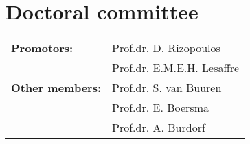 
\newpage
\thispagestyle{empty}

\section*{Doctoral committee}
\begin{tabular}{ll}
\textbf{Promotors:} & Prof.dr. D. Rizopoulos\\
                    & Prof.dr. E.M.E.H. Lesaffre\\[1cm]
\textbf{Other members:} & Prof.dr. S. van Buuren\\
                        & Prof.dr. E. Boersma\\
                        & Prof.dr. A. Burdorf\\[1cm]
\end{tabular}



%

\cleardoublepage


\let\maketitle\oldmaketitle
\maketitle
